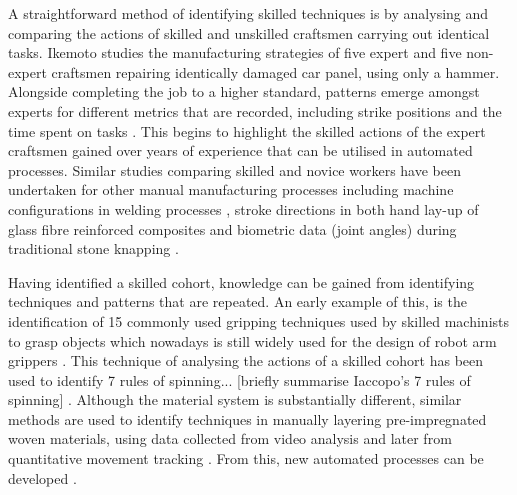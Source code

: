 A straightforward method of identifying skilled techniques is by analysing and comparing the actions of skilled and unskilled craftsmen carrying out identical tasks. Ikemoto studies the manufacturing strategies of five expert and five non-expert craftsmen repairing identically damaged car panel, using only a hammer.  Alongside completing the job to a higher standard, patterns emerge amongst experts for different metrics that are recorded, including strike positions \citep{Ikemoto2018ProcessRepair} and the time spent on tasks \citep{Ikemoto2016ARepair}. This begins to highlight the skilled actions of the expert craftsmen gained over years of experience that can be utilised in automated processes. Similar studies comparing skilled and novice workers have been undertaken for other manual manufacturing processes including machine configurations in welding processes \citep{Manorathna2017HumanAutomation}, stroke directions in both hand lay-up of glass fibre reinforced composites \citep{Xie2016EffectMethod, Kikuchi2016ResearchLay-up} and biometric data (joint angles) during traditional stone knapping \citep{Rein2014MovementTraditions}. 

Having identified a skilled cohort, knowledge can be gained from identifying techniques and patterns that are repeated. An early example of this, is the identification of 15 commonly used gripping techniques used by skilled machinists to grasp objects \citep{Cutkosky1986ModellingHands} which nowadays is still widely used for the design of robot arm grippers \citep{Feix2016TheTypes}. This technique of analysing the actions of a skilled cohort has been used to identify 7 rules of spinning... [briefly summarise Iaccopo's 7 rules of spinning] \citep{Russo2020ResearchSpinning}.
Although the material system is substantially different, similar methods are used to identify techniques in manually layering pre-impregnated woven materials, using data collected from video analysis \citep{Elkington2015HandProcess, Elkington2015StudyingLayup} and later from quantitative movement tracking \citep{Prabhu2017DigitisationTechnology}. From this, new automated processes can be developed \citep{Elkington2016AutomatedMoulds}.



